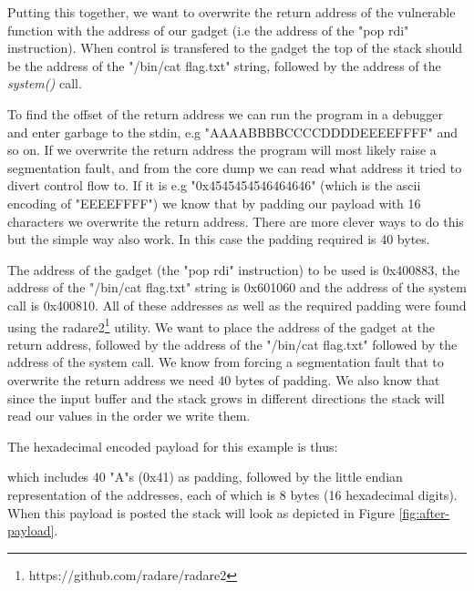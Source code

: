 Putting this together, we want to overwrite the return address of the vulnerable function
with the address of our gadget (i.e the address of the "pop rdi" instruction). When control
is transfered to the gadget the top of the stack should be the address of the "/bin/cat flag.txt"
string, followed by the address of the \textit{system()} call.

To find the offset of the return address we can run the program in a debugger and enter
garbage to the stdin, e.g "AAAABBBBCCCCDDDDEEEEFFFF" and so on. If we overwrite the return
address the program will most likely raise a segmentation fault, and from the core dump we
can read what address it tried to divert control flow to. If it is e.g "0x4545454546464646"
(which is the ascii encoding of "EEEEFFFF") we know that by padding our payload with 16
characters we overwrite the return address. There are more clever ways to do this but the
simple way also work. In this case the padding required is 40 bytes.

The address of the gadget (the "pop rdi" instruction) to be used is 0x400883, the address
of the "/bin/cat flag.txt" string is 0x601060 and the address of the system call is
0x400810. All of these addresses as well as the required padding were found using the
radare2\footnote{https://github.com/radare/radare2} utility. We want to place the address
of the gadget at the return address, followed by the address of the "/bin/cat flag.txt"
followed by the address of the system call. We know from forcing a segmentation fault that
to overwrite the return address we need 40 bytes of padding. We also know that since the
input buffer and the stack grows in different directions the stack will read our values in
the order we write them.

The hexadecimal encoded payload for this example is thus:


which includes 40 "A"s (0x41) as padding, followed by the little endian
representation of the addresses, each of which is 8 bytes (16 hexadecimal digits). When
this payload is posted the stack will look as depicted in Figure \ref{fig:after-payload}.

